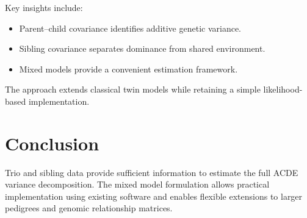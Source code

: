 \documentclass[11pt]{article}
\begin{document}
Key insights include:

\begin{itemize}
\item Parent--child covariance identifies additive genetic variance.
\item Sibling covariance separates dominance from shared environment.
\item Mixed models provide a convenient estimation framework.
\end{itemize}

The approach extends classical twin models while retaining a simple 
likelihood-based implementation.

\section{Conclusion}

Trio and sibling data provide sufficient information to estimate the full 
ACDE variance decomposition. The mixed model formulation allows practical 
implementation using existing software and enables flexible extensions 
to larger pedigrees and genomic relationship matrices.
\end{document}
